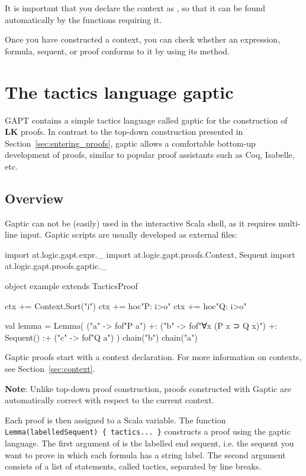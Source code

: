 \documentclass[a4paper,11pt]{book}
\newcommand{\LK}{\textbf{LK}}
\newcommand{\cli}[1]{{\ttfamily {#1}}}
\begin{document}
It is important that you declare the context as \cli{implicit}, so that it can be found automatically
by the functions requiring it.

Once you have constructed a context, you can check whether an expression, formula, sequent, or proof conforms to it by using its \cli{check} method.

\section{The tactics language gaptic}\label{sec:gaptic}

GAPT contains a simple tactics language called gaptic for the construction of {\LK} proofs.
In contrast to the top-down construction presented in Section~\ref{sec:entering_proofs},
gaptic allows a comfortable bottom-up development of proofs, similar
to popular proof assistants such as Coq, Isabelle, etc.

\subsection{Overview}

Gaptic can not be (easily) used in the interactive Scala shell, as it requires
multi-line input.  Gaptic scripts are usually developed as external files:
\begin{tacticslisting}
import at.logic.gapt.expr._
import at.logic.gapt.proofs.{Context, Sequent}
import at.logic.gapt.proofs.gaptic._

object example extends TacticsProof {
  ctx += Context.Sort("i")
  ctx += hoc"P: i>o"
  ctx += hoc"Q: i>o"

  val lemma = Lemma(
    ("a" -> fof"P a") +:
    ("b" -> fof"∀x (P x ⊃ Q x)") +:
    Sequent()
    :+ ("c" -> fof"Q a")
  ) {
    chain("b")
    chain("a")
  }
}
\end{tacticslisting}
\begin{tacticsoutput}
\end{tacticsoutput}

Gaptic proofs start with a context declaration. For more information on
contexts, see Section~\ref{sec:context}.

\textbf{Note}: Unlike top-down proof construction, proofs constructed with Gaptic
are automatically correct with respect to the current context.

Each proof is then assigned to a Scala variable.  The function
\verb,Lemma(labelledSequent) { tactics... }, constructs a proof using the
gaptic language.  The first argument of \cli{Lemma} is the labelled end
sequent, i.e. the sequent you want to prove in which each formula has a string
label.  The second argument consists of a list of statements, called tactics,
separated by line breaks.
\end{document}

